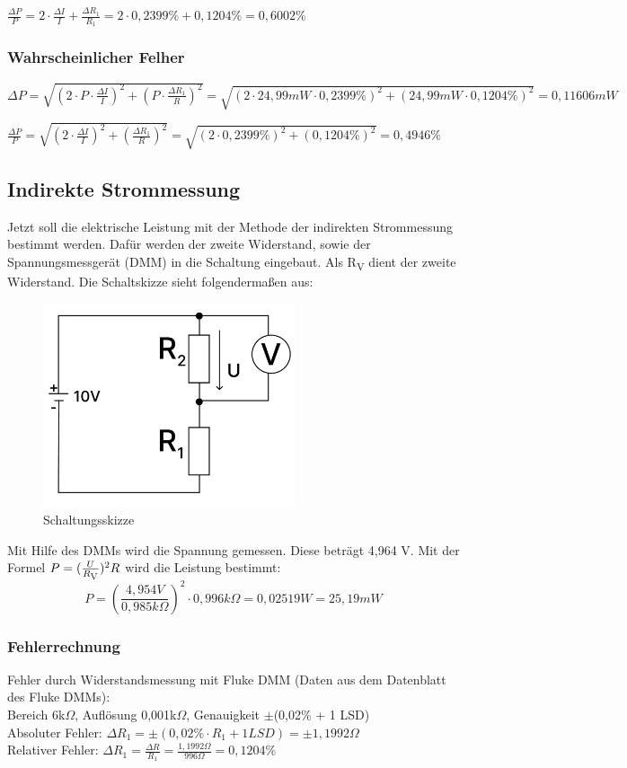 $\frac{\Delta P}{P} = 2 \cdot \frac{\Delta I}{I} + \frac{\Delta R_1}{R_1} =
2 \cdot 0,2399\% + 0,1204\% = 0,6002\%$

\subsubsection{Wahrscheinlicher Felher}
$ \Delta P = \sqrt{(2 \cdot P \cdot \frac{\Delta I}{I})^2 + (P \cdot \frac{\Delta R_1}{R})^2} =
\sqrt{(2 \cdot 24,99 mW \cdot 0,2399\%)^2 + (24,99 mW \cdot 0,1204\%)^2} = 0,11606mW$

$\frac{\Delta P}{P} = \sqrt{(2 \cdot \frac{\Delta I}{I})^2 + (\frac{\Delta R_1}{R})^2} =
\sqrt{(2 \cdot 0,2399\%)^2 + (0,1204\%)^2} = 0,4946\%$



\subsection{Indirekte Strommessung}
Jetzt soll die elektrische Leistung mit der Methode der indirekten Strommessung
bestimmt werden. Dafür werden der zweite Widerstand, sowie der Spannungsmessgerät
(DMM) in die Schaltung eingebaut. Als R\textsubscript{V} dient der
zweite Widerstand. Die Schaltskizze sieht folgendermaßen aus:

\begin{figure}[H]
	\centering
	\includegraphics[height=6cm]{images/Versuch3/Versuch3_2_Schaltskizze.pdf} 
	\caption{Schaltungsskizze}
	\label{fig: Schaltungsskizze Versuch 3_2}
\end{figure}

Mit Hilfe des DMMs wird die Spannung gemessen. Diese beträgt 4,964 V. Mit der
Formel $P = (\frac{U}{R\textsubscript{V}})^{2}R$ wird die Leistung bestimmt: 
\[P = (\frac{4,954 V}{0,985 k\Omega})^{2}\cdot 0,996k\Omega = 0,02519 W = 25,19 mW\]

\subsubsection{Fehlerrechnung}
Fehler durch Widerstandsmessung mit Fluke DMM (Daten aus dem Datenblatt des Fluke DMMs):\\
Bereich 6k$\Omega$, Auflösung 0,001k$\Omega$, Genauigkeit $\pm$(0,02\% + 1 LSD)\\
Absoluter Fehler: $\Delta R_1 = \pm (0,02\% \cdot R_1 + 1 LSD) = \pm 1,1992 \Omega$\\
Relativer Fehler: $\Delta R_1 = \frac{\Delta R}{R_1} = \frac{1,1992 \Omega}{996 \Omega} = 0,1204\%$\par

